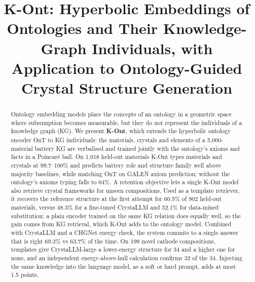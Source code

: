 \documentclass[conference]{IEEEtran}
\begin{document}
\title{K-Ont: Hyperbolic Embeddings of Ontologies and Their Knowledge-Graph Individuals, with Application to Ontology-Guided Crystal Structure Generation}
\author{
 \and
{} \and
{} \and
{} \and
{} \and
{}
}
\maketitle
\begin{abstract}
Ontology embedding models place the concepts of an ontology in a geometric space where subsumption becomes measurable, but they do not represent the individuals of a knowledge graph (KG). We present \textbf{K-Ont}, which extends the hyperbolic ontology encoder OnT to KG individuals: the materials, crystals and elements of a 5,000-material battery KG are verbalised and trained jointly with the ontology's axioms and facts in a Poincar\'e ball. On 1,018 held-out materials K-Ont types materials and crystals at 99.7--100\% and predicts battery role and structure family well above majority baselines, while matching OnT on GALEN axiom prediction; without the ontology's axioms typing falls to 64\%. A retention objective lets a single K-Ont model also retrieve crystal frameworks for unseen compositions. Used as a template retriever, it recovers the reference structure at the first attempt for 60.5\% of 902 held-out materials, versus 48.3\% for a fine-tuned CrystaLLM and 52.1\% for data-mined substitution; a plain encoder trained on the same KG relation does equally well, so the gain comes from KG retrieval, which K-Ont adds to the ontology model. Combined with CrystaLLM and a CHGNet energy check, the system commits to a single answer that is right 69.3\% vs 63.7\% of the time. On 199 novel cathode compositions, templates give CrystaLLM-large a lower-energy structure for 34 and a higher one for none, and an independent energy-above-hull calculation confirms 32 of the 34. Injecting the same knowledge into the language model, as a soft or hard prompt, adds at most 1.5 points.
\end{abstract}
\end{document}

